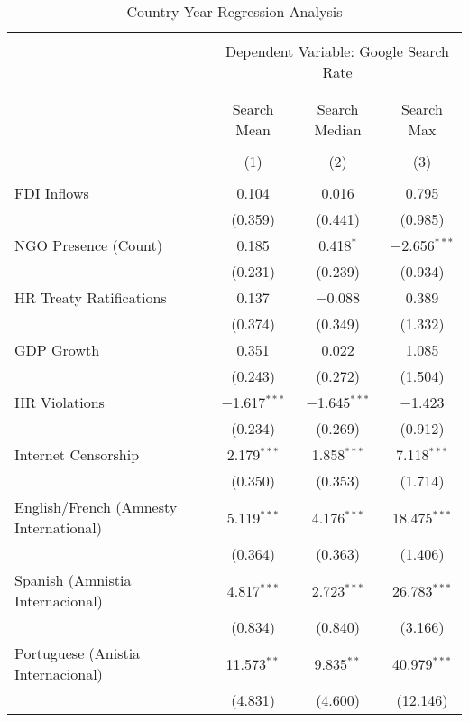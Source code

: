 
\begin{table}[!htbp] \centering 
  \caption{Country-Year Regression Analysis} 
  \label{} 
\begin{tabular}{@{\extracolsep{5pt}}lccc} 
\\[-1.8ex]\hline 
\hline \\[-1.8ex] 
 & \multicolumn{3}{c}{Dependent Variable: Google Search Rate} \\ 
\cline{2-4} 
\\[-1.8ex] & \multicolumn{3}{c}{ } \\ 
 & Search Mean & Search Median & Search Max \\ 
\\[-1.8ex] & (1) & (2) & (3)\\ 
\hline \\[-1.8ex] 
 FDI Inflows & 0.104 & 0.016 & 0.795 \\ 
  & (0.359) & (0.441) & (0.985) \\ 
  NGO Presence (Count) & 0.185 & 0.418$^{*}$ & $-$2.656$^{***}$ \\ 
  & (0.231) & (0.239) & (0.934) \\ 
  HR Treaty Ratifications & 0.137 & $-$0.088 & 0.389 \\ 
  & (0.374) & (0.349) & (1.332) \\ 
  GDP Growth & 0.351 & 0.022 & 1.085 \\ 
  & (0.243) & (0.272) & (1.504) \\ 
  HR Violations & $-$1.617$^{***}$ & $-$1.645$^{***}$ & $-$1.423 \\ 
  & (0.234) & (0.269) & (0.912) \\ 
  Internet Censorship & 2.179$^{***}$ & 1.858$^{***}$ & 7.118$^{***}$ \\ 
  & (0.350) & (0.353) & (1.714) \\ 
  English/French (Amnesty International) & 5.119$^{***}$ & 4.176$^{***}$ & 18.475$^{***}$ \\ 
  & (0.364) & (0.363) & (1.406) \\ 
  Spanish (Amnistia Internacional) & 4.817$^{***}$ & 2.723$^{***}$ & 26.783$^{***}$ \\ 
  & (0.834) & (0.840) & (3.166) \\ 
  Portuguese (Anistia Internacional) & 11.573$^{**}$ & 9.835$^{**}$ & 40.979$^{***}$ \\ 
  & (4.831) & (4.600) & (12.146) \\ 

\end{tabular}
\end{table}
